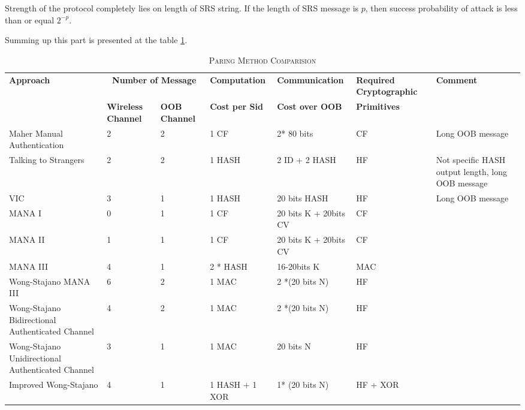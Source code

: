 Strength of the protocol completely lies on length of SRS string. If the length of SRS message is $p$, then success probability of attack is less than or equal $2^{-p}$. 

Summing up this part is presented at the table \ref{paircom}.

\begin{table}[ht] 
\centering
\caption{\textsc{Paring Method Comparision}}
\label{paircom}
{\scriptsize
\begin{tabular}{ | p{2cm} | p{1.4cm} | p{1.4cm} | p{2cm} | p{2.2cm} | p{2cm} | p{2cm}| }
\hline
\textbf{Approach} &\multicolumn{2}{c}{ \textbf{Number of Message}} & \textbf{Computation} & \textbf{Communication} & \textbf{Required Cryptographic} & \textbf{Comment}\\ 
 & \textbf{Wireless Channel} & \textbf{OOB Channel} & \textbf{Cost per Sid} & \textbf{Cost over OOB} & \textbf{Primitives} & \\ \hline \hline

Maher Manual Authentication & 2 & 2 & 1 CF & 2* 80 bits & CF & Long OOB message \\ \hline

Talking to Strangers & 2 &	 2	& 1 HASH &	 2 ID + 2 HASH	& HF	& Not specific HASH output length, long OOB message \\ \hline 

VIC & 3	& 1	& 1 HASH 	 & 20 bits HASH	& HF & Long OOB message \\ \hline 

MANA I	& 0	& 1	& 1 CF & 20 bits K + 20bits CV	& CF & \\ \hline 

MANA II	& 1	& 1 & 1 CF & 20 bits K + 20bits CV	& CF & \\ \hline 

MANA III	& 4	& 1 & 2 * HASH	& 16-20bits K & MAC & \\ \hline 

Wong-Stajano MANA III & 6 & 2	& 1 MAC	& 2 *(20 bits N) & HF & \\ \hline 

Wong-Stajano Bidirectional Authenticated Channel & 4	 & 2	& 1 MAC & 2 *(20 bits N) 	 & HF	 & \\ \hline 

Wong-Stajano Unidirectional Authenticated Channel & 3 &	 1	& 1 MAC	 & 20 bits N &	 HF & \\ \hline 

Improved Wong-Stajano & 4	& 1	& 1 HASH + 1 XOR	 & 1* (20 bits N) &	 HF + XOR & \\ \hline 


\end{tabular}}
\end{table}
